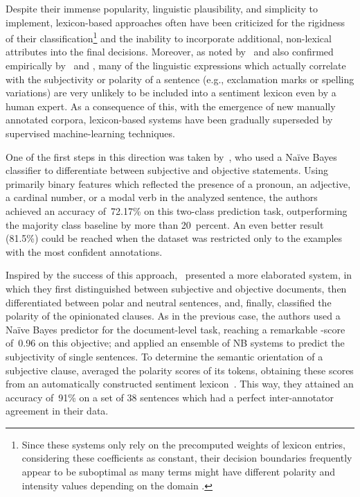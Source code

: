 Despite their immense popularity, linguistic plausibility, and
simplicity to implement, lexicon-based approaches often have been
criticized for the rigidness of their classification\footnote{Since
  these systems only rely on the precomputed weights of lexicon
  entries, considering these coefficients as constant, their decision
  boundaries frequently appear to be suboptimal as many terms might
  have different polarity and intensity values depending on the domain
  \cite[see][]{Eisenstein:17,Yang:17}.} and the inability to
incorporate additional, non-lexical attributes into the final
decisions.  Moreover, as noted by~\citet{Pang:02} and also confirmed
empirically by~\citet{Riloff:03} and \citet{Gamon:04}, many of the
linguistic expressions which actually correlate with the subjectivity
or polarity of a sentence (e.g., exclamation marks or spelling
variations) are very unlikely to be included into a sentiment lexicon
even by a human expert.  As a consequence of this, with the emergence
of new manually annotated corpora, lexicon-based systems have been
gradually superseded by supervised machine-learning techniques.

One of the first steps in this direction was taken
by~\citet{Wiebe:99}, who used a Na{\"i}ve Bayes classifier to
differentiate between subjective and objective statements.  Using
primarily binary features which reflected the presence of a pronoun,
an adjective, a cardinal number, or a modal verb in the analyzed
sentence, the authors achieved an accuracy of~72.17\% on this
two-class prediction task, outperforming the majority class baseline
by more than 20~percent.  An even better result (81.5\%) could be
reached when the dataset was restricted only to the examples with the
most confident annotations.

Inspired by the success of this approach,~\citet{Yu:03} presented a
more elaborated system, in which they first distinguished between
subjective and objective documents, then differentiated between polar
and neutral sentences, and, finally, classified the polarity of the
opinionated clauses.  As in the previous case, the authors used a
Na{\"i}ve Bayes predictor for the document-level task, reaching a
remarkable \F-score of~0.96 on this objective; and applied an ensemble
of NB systems to predict the subjectivity of single sentences.  To
determine the semantic orientation of a subjective clause,
\citeauthor{Yu:03} averaged the polarity scores of its tokens,
obtaining these scores from an automatically constructed sentiment
lexicon~\cite{Hatzivassi:97}.  This way, they attained an accuracy
of~91\% on a set of 38 sentences which had a perfect inter-annotator
agreement in their data.

